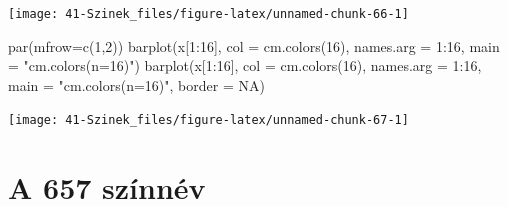 \documentclass[
]{book}
\newenvironment{Shaded}{\begin{snugshade}}{\end{snugshade}}
\newcommand{\AttributeTok}[1]{\textcolor[rgb]{0.77,0.63,0.00}{#1}}
\newcommand{\ConstantTok}[1]{\textcolor[rgb]{0.00,0.00,0.00}{#1}}
\newcommand{\DecValTok}[1]{\textcolor[rgb]{0.00,0.00,0.81}{#1}}
\newcommand{\FunctionTok}[1]{\textcolor[rgb]{0.00,0.00,0.00}{#1}}
\newcommand{\NormalTok}[1]{#1}
\newcommand{\SpecialCharTok}[1]{\textcolor[rgb]{0.00,0.00,0.00}{#1}}
\newcommand{\StringTok}[1]{\textcolor[rgb]{0.31,0.60,0.02}{#1}}
\begin{document}
\begin{center}\texttt{[image: 41-Szinek\_files/figure-latex/unnamed-chunk-66-1]} \end{center}

\begin{Shaded}
\begin{Highlighting}[]
\FunctionTok{par}\NormalTok{(}\AttributeTok{mfrow=}\FunctionTok{c}\NormalTok{(}\DecValTok{1}\NormalTok{,}\DecValTok{2}\NormalTok{))}
\FunctionTok{barplot}\NormalTok{(x[}\DecValTok{1}\SpecialCharTok{:}\DecValTok{16}\NormalTok{], }\AttributeTok{col =} \FunctionTok{cm.colors}\NormalTok{(}\DecValTok{16}\NormalTok{), }\AttributeTok{names.arg =} \DecValTok{1}\SpecialCharTok{:}\DecValTok{16}\NormalTok{, }\AttributeTok{main =} \StringTok{"cm.colors(n=16)"}\NormalTok{)}
\FunctionTok{barplot}\NormalTok{(x[}\DecValTok{1}\SpecialCharTok{:}\DecValTok{16}\NormalTok{], }\AttributeTok{col =} \FunctionTok{cm.colors}\NormalTok{(}\DecValTok{16}\NormalTok{), }\AttributeTok{names.arg =} \DecValTok{1}\SpecialCharTok{:}\DecValTok{16}\NormalTok{, }\AttributeTok{main =} \StringTok{"cm.colors(n=16)"}\NormalTok{, }\AttributeTok{border =} \ConstantTok{NA}\NormalTok{)}
\end{Highlighting}
\end{Shaded}

\begin{center}\texttt{[image: 41-Szinek\_files/figure-latex/unnamed-chunk-67-1]} \end{center}

\hypertarget{a-657-szinnev}{%
\section{A 657 színnév}\label{a-657-szinnev}}
\end{document}

